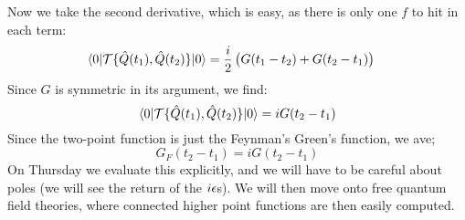 Now we take the second derivative, which is easy, as there is only one $f$ to hit in each term:
\begin{equation}
    \begin{split}
        \langle 0 \rvert\mathcal{T}\{\hat{Q}(t_1), \hat{Q}(t_2)\}\lvert 0 \rangle &= \frac{i}{2}\left(G(t_1 - t_2) + G(t_2 - t_1)\right)
    \end{split}
\end{equation}
Since $G$ is symmetric in its argument, we find:
\begin{equation}
    \langle 0 \rvert\mathcal{T}\{\hat{Q}(t_1), \hat{Q}(t_2)\}\lvert 0 \rangle = iG(t_2 - t_1)
\end{equation}
Since the two-point function is just the Feynman's Green's function, we ave;
\begin{equation}
    G_F(t_2 - t_1) = iG(t_2 - t_1)
\end{equation}
On Thursday we evaluate this explicitly, and we will have to be careful about poles (we will see the return of the $i\epsilon$s). We will then move onto free quantum field theories, where connected higher point functions are then easily computed.
